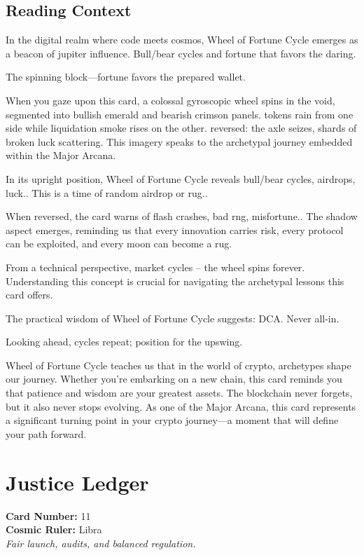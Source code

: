 \documentclass[11pt,oneside]{book}
\begin{document}
\begin{minipage}[t]{0.55\textwidth}
  \subsection*{Reading Context}
  In the digital realm where code meets cosmos, Wheel of Fortune Cycle emerges as a beacon of jupiter influence. Bull/bear cycles and fortune that favors the daring.

  The spinning block—fortune favors the prepared wallet.

  When you gaze upon this card, a colossal gyroscopic wheel spins in the void, segmented into bullish emerald and bearish crimson panels. tokens rain from one side while liquidation smoke rises on the other. reversed: the axle seizes, shards of broken luck scattering. This imagery speaks to the archetypal journey embedded within the Major Arcana.

  In its upright position, Wheel of Fortune Cycle reveals bull/bear cycles, airdrops, luck.. This is a time of random airdrop or rug..

  When reversed, the card warns of flash crashes, bad rng, misfortune.. The shadow aspect emerges, reminding us that every innovation carries risk, every protocol can be exploited, and every moon can become a rug.

  From a technical perspective, market cycles – the wheel spins forever. Understanding this concept is crucial for navigating the archetypal lessons this card offers.

  The practical wisdom of Wheel of Fortune Cycle suggests: DCA. Never all-in.

  Looking ahead, cycles repeat; position for the upswing.

  Wheel of Fortune Cycle teaches us that in the world of crypto, archetypes shape our journey. Whether you're embarking on a new chain, this card reminds you that patience and wisdom are your greatest assets. The blockchain never forgets, but it also never stops evolving. As one of the Major Arcana, this card represents a significant turning point in your crypto journey—a moment that will define your path forward.

\end{minipage}

\newpage
\section*{Justice Ledger}

\begin{minipage}[t]{0.55\textwidth}
  \vspace{0pt}
  \textbf{Card Number:} 11\\  \textbf{Cosmic Ruler:} Libra\\  \textit{Fair launch, audits, and balanced regulation.}
\end{minipage}
\end{document}
